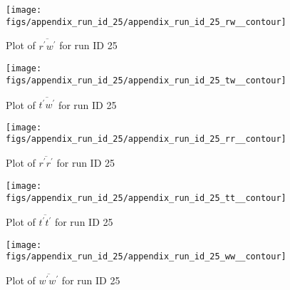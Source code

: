 \begin{figure}[H]
\centering
\texttt{[image: figs/appendix\_run\_id\_25/appendix\_run\_id\_25\_rw\_\_contour]}
\caption{Plot of $\overline{r^\prime w^\prime}$ for run ID 25}
\label{fig:appendix_run_id_25_rw__contour}
\end{figure}


\begin{figure}[H]
\centering
\texttt{[image: figs/appendix\_run\_id\_25/appendix\_run\_id\_25\_tw\_\_contour]}
\caption{Plot of $\overline{t^\prime w^\prime}$ for run ID 25}
\label{fig:appendix_run_id_25_tw__contour}
\end{figure}


\begin{figure}[H]
\centering
\texttt{[image: figs/appendix\_run\_id\_25/appendix\_run\_id\_25\_rr\_\_contour]}
\caption{Plot of $\overline{r^\prime r^\prime}$ for run ID 25}
\label{fig:appendix_run_id_25_rr__contour}
\end{figure}


\begin{figure}[H]
\centering
\texttt{[image: figs/appendix\_run\_id\_25/appendix\_run\_id\_25\_tt\_\_contour]}
\caption{Plot of $\overline{t^\prime t^\prime}$ for run ID 25}
\label{fig:appendix_run_id_25_tt__contour}
\end{figure}


\begin{figure}[H]
\centering
\texttt{[image: figs/appendix\_run\_id\_25/appendix\_run\_id\_25\_ww\_\_contour]}
\caption{Plot of $\overline{w^\prime w^\prime}$ for run ID 25}
\label{fig:appendix_run_id_25_ww__contour}
\end{figure}


